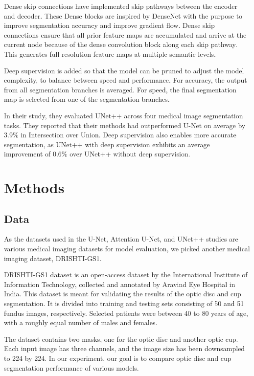 \documentclass[conference]{IEEEtran}
\begin{document}
Dense skip connections have implemented skip pathways between the encoder and decoder. These Dense blocks are inspired by DenseNet\cite{huang2017densely} with the purpose to improve segmentation accuracy and improve gradient flow. Dense skip connections ensure that all prior feature maps are accumulated and arrive at the current node because of the dense convolution block along each skip pathway. This generates full resolution feature maps at multiple semantic levels.

Deep supervision is added so that the model can be pruned to adjust the model complexity, to balance between speed and performance. For accuracy, the output from all segmentation branches is averaged. For speed, the final segmentation map is selected from one of the segmentation branches.

In their study, they evaluated UNet++ across four medical image segmentation tasks. They reported that their methods had outperformed U-Net on average by 3.9\% in Intersection over Union. Deep supervision also enables more accurate segmentation, as UNet++ with deep supervision exhibits an average improvement of 0.6\% over UNet++ without deep supervision.

\section{Methods}

\subsection{Data}

As the datasets used in the U-Net, Attention U-Net, and UNet++ studies are various medical imaging datasets for model evaluation, we picked another medical imaging dataset, DRISHTI-GS1\cite{sivaswamy2014drishti}. 

DRISHTI-GS1 dataset is an open-access dataset by the International Institute of Information Technology, collected and annotated by Aravind Eye Hospital in India. This dataset is meant for validating the results of the optic disc and cup segmentation. It is divided into training and testing sets consisting of 50 and 51 fundus images, respectively. Selected patients were between 40 to 80 years of age, with a roughly equal number of males and females. 

The dataset contains two masks, one for the optic disc and another optic cup. Each input image has three channels, and the image size has been downsampled to 224 by 224. In our experiment, our goal is to compare optic disc and cup segmentation performance of various models. 
\end{document}
